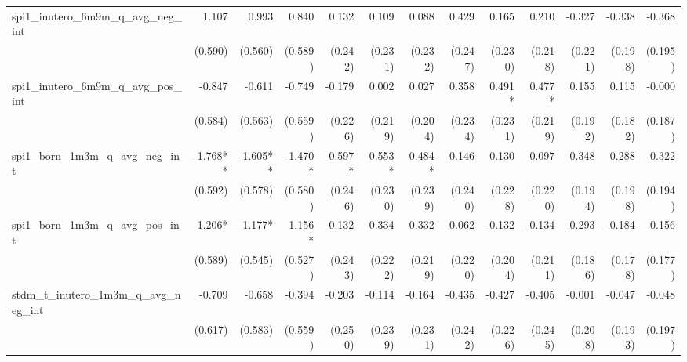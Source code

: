 \begin{tabular}{lrrrrrrrrrrrr}
spi1\_inutero\_6m9m\_q\_avg\_neg\_int       &        1.107 &        0.993 &        0.840 &        0.132 &        0.109 &        0.088 &        0.429 &        0.165 &        0.210 &       -0.327 &       -0.338 &       -0.368 \\ 
                                            &      (0.590) &      (0.560) &      (0.589) &      (0.242) &      (0.231) &      (0.232) &      (0.247) &      (0.230) &      (0.218) &      (0.221) &      (0.198) &      (0.195) \\ 
spi1\_inutero\_6m9m\_q\_avg\_pos\_int       &       -0.847 &       -0.611 &       -0.749 &       -0.179 &        0.002 &        0.027 &        0.358 &       0.491* &       0.477* &        0.155 &        0.115 &       -0.000 \\ 
                                            &      (0.584) &      (0.563) &      (0.559) &      (0.226) &      (0.219) &      (0.204) &      (0.234) &      (0.231) &      (0.219) &      (0.192) &      (0.182) &      (0.187) \\ 
spi1\_born\_1m3m\_q\_avg\_neg\_int          &     -1.768** &     -1.605** &      -1.470* &       0.597* &       0.553* &       0.484* &        0.146 &        0.130 &        0.097 &        0.348 &        0.288 &        0.322 \\ 
                                            &      (0.592) &      (0.578) &      (0.580) &      (0.246) &      (0.230) &      (0.239) &      (0.240) &      (0.228) &      (0.220) &      (0.194) &      (0.198) &      (0.194) \\ 
spi1\_born\_1m3m\_q\_avg\_pos\_int          &       1.206* &       1.177* &       1.156* &        0.132 &        0.334 &        0.332 &       -0.062 &       -0.132 &       -0.134 &       -0.293 &       -0.184 &       -0.156 \\ 
                                            &      (0.589) &      (0.545) &      (0.527) &      (0.243) &      (0.222) &      (0.219) &      (0.220) &      (0.204) &      (0.211) &      (0.186) &      (0.178) &      (0.177) \\ 
stdm\_t\_inutero\_1m3m\_q\_avg\_neg\_int    &       -0.709 &       -0.658 &       -0.394 &       -0.203 &       -0.114 &       -0.164 &       -0.435 &       -0.427 &       -0.405 &       -0.001 &       -0.047 &       -0.048 \\ 
                                            &      (0.617) &      (0.583) &      (0.559) &      (0.250) &      (0.239) &      (0.231) &      (0.242) &      (0.226) &      (0.245) &      (0.208) &      (0.193) &      (0.197) \\ 

\end{tabular}
